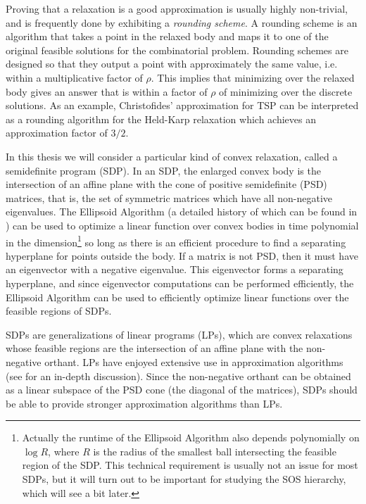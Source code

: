 Proving that a relaxation is a good approximation is usually highly non-trivial, and is frequently done by exhibiting a \emph{rounding scheme}. A rounding scheme is an  algorithm that takes a point in the relaxed body and maps it to one of the original feasible solutions for the combinatorial problem. Rounding schemes are designed so that they output a point with approximately the same value, i.e. within a multiplicative factor of $\rho$. This implies that minimizing over the relaxed body gives an answer that is within a factor of $\rho$ of minimizing over the discrete solutions. As an example, Christofides' approximation for \textsc{TSP} \cite{Chri76} can be interpreted as a rounding algorithm for the Held-Karp relaxation which achieves an approximation factor of $3/2$.

In this thesis we will consider a particular kind of convex relaxation, called a semidefinite program (SDP). In an SDP, the enlarged convex body is the intersection of an affine plane with the cone of positive semidefinite (PSD) matrices, that is, the set of symmetric matrices which have all non-negative eigenvalues. The Ellipsoid Algorithm (a detailed history of which can be found in \cite{Akg84}) can be used to optimize a linear function over convex bodies in time polynomial in the dimension\footnote{Actually the runtime of the Ellipsoid Algorithm also depends polynomially on $\log R$, where $R$ is the radius of the smallest ball intersecting the feasible region of the SDP. This technical requirement is usually not an issue for most SDPs, but it will turn out to be important for studying the SOS hierarchy, which will see a bit later.} so long as there is an efficient procedure to find a separating hyperplane for points outside the body. If a matrix is not PSD, then it must have an eigenvector with a negative eigenvalue. This eigenvector forms a separating hyperplane, and since eigenvector computations can be performed efficiently, the Ellipsoid Algorithm can be used to efficiently optimize linear functions over the feasible regions of SDPs. 

SDPs are generalizations of linear programs (LPs), which are convex relaxations whose feasible regions are the intersection of an affine plane with the non-negative orthant. LPs have enjoyed extensive use in approximation algorithms (see \cite{WSbook11} for an in-depth discussion). Since the non-negative orthant can be obtained as a linear subspace of the PSD cone (the diagonal of the matrices), SDPs should be able to provide stronger approximation algorithms than LPs. 

